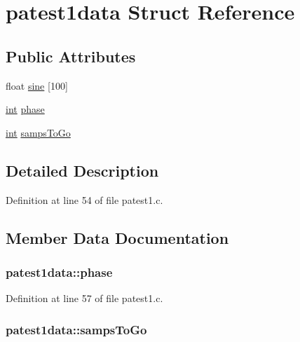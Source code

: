 \hypertarget{structpatest1data}{}\section{patest1data Struct Reference}
\label{structpatest1data}
\subsection*{Public Attributes}
\begin{DoxyCompactItemize}
\item 
float \hyperlink{structpatest1data_ad60ff32735775a159a8958032e9e3cab}{sine} \mbox{[}100\mbox{]}
\item 
\hyperlink{xmltok_8h_a5a0d4a5641ce434f1d23533f2b2e6653}{int} \hyperlink{structpatest1data_ad04058d9d5ed169899d72f1c686c35f7}{phase}
\item 
\hyperlink{xmltok_8h_a5a0d4a5641ce434f1d23533f2b2e6653}{int} \hyperlink{structpatest1data_a53bc230b1c3ceef7977b4b8b757ab38c}{samps\+To\+Go}
\end{DoxyCompactItemize}


\subsection{Detailed Description}


Definition at line 54 of file patest1.\+c.



\subsection{Member Data Documentation}
\subsubsection[{\texorpdfstring{phase}{phase}}]{ patest1data\+::phase}\hypertarget{structpatest1data_ad04058d9d5ed169899d72f1c686c35f7}{}\label{structpatest1data_ad04058d9d5ed169899d72f1c686c35f7}


Definition at line 57 of file patest1.\+c.

\subsubsection[{\texorpdfstring{samps\+To\+Go}{sampsToGo}}]{ patest1data\+::samps\+To\+Go}\hypertarget{structpatest1data_a53bc230b1c3ceef7977b4b8b757ab38c}{}\label{structpatest1data_a53bc230b1c3ceef7977b4b8b757ab38c}


